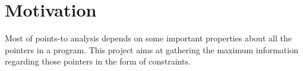 \section{Motivation}

Most of points-to analysis depends on some important properties about all the pointers in a program. This project aims at gathering the maximum information regarding those pointers in the form of constraints.
